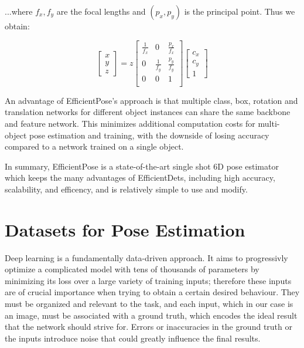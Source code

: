 ...where $f_x, f_y$ are the focal lengths and $(p_x, p_y)$ is the principal point. Thus we obtain:

\begin{equation}
    \begin{bmatrix}
        x\\y\\z
    \end{bmatrix}
    =z
    \begin{bmatrix}
        \frac{1}{f_x} & 0 & \frac{p_x}{f_x} \\
        0 & \frac{1}{f_y} & \frac{p_y}{f_y} \\
        0 & 0 & 1 \\
    \end{bmatrix}
    \begin{bmatrix}
        c_x\\c_y\\1
    \end{bmatrix}
\end{equation}

An advantage of EfficientPose's approach is that multiple class, box, rotation and translation networks for different object instances can share the same backbone and feature network. This minimizes additional computation costs for multi-object pose estimation and training, with the downside of losing accuracy compared to a network trained on a single object. 

In summary, EfficientPose is a state-of-the-art single shot 6D pose estimator which keeps the many advantages of EfficientDets, including high accuracy, scalability, and efficency, and is relatively simple to use and modify.

\section{Datasets for Pose Estimation}

Deep learning is a fundamentally data-driven approach. It aims to progressivly optimize a complicated model with tens of thousands of parameters by minimizing its loss over a large variety of training inputs; therefore these inputs are of crucial importance when trying to obtain a certain desired behaviour. They must be organized and relevant to the task, and each input, which in our case is an image, must be associated with a ground truth, which encodes the ideal result that the network should strive for. Errors or inaccuracies in the ground truth or the inputs introduce noise that could greatly influence the final results.

